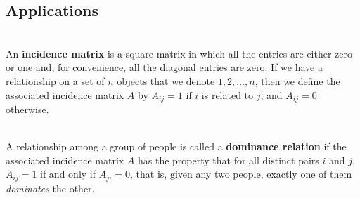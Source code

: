 \subsection*{Applications}

\begin{definition}
	\hfill\\
	An \textbf{incidence matrix} is a square matrix in which all the entries are either zero or one and, for convenience, all the diagonal entries are zero. If we have a relationship on a set of $n$ objects that we denote $1, 2, \dots, n$, then we define the associated incidence matrix $A$ by $A_{ij} = 1$ if $i$ is related to $j$, and $A_{ij} = 0$ otherwise.
\end{definition}

\begin{definition}
	\hfill\\
	A relationship among a group of people is called a \textbf{dominance relation} if the associated incidence matrix $A$ has the property that for all distinct pairs $i$ and $j$, $A_{ij} = 1$ if and only if $A_{ji} = 0$, that is, given any two people, exactly one of them \textit{dominates} the other.
\end{definition}
